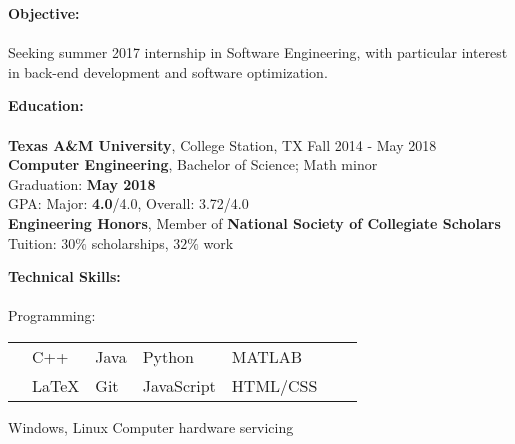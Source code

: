 \documentclass[12pt]{article}
\begin{document}
\begin{flushleft}
\begin{outline}[compactitem]

\newlength{\upspacelength}
\setlength{\upspacelength}{-0.8px}
\newcommand{\upspace}{\vspace{\upspacelength}}
\newcommand{\zzz}[1]{\upspace \0 \textbf{#1} \\ \vspace{-0.8\baselineskip} \hrulefill \vspace{-2px} \\ }
\let\oldOne\1\let\oldTwo\2\let\oldThree\3\let\oldFour\4
\renewcommand{\1}{\upspace \oldOne  }
\renewcommand{\2}{\upspace \oldTwo  }
\renewcommand{\3}{\upspace \oldThree}
\renewcommand{\4}{\upspace \oldFour }


\zzz{Objective:}
  \1 Seeking summer 2017 internship in Software Engineering, with particular interest in back-end development and software optimization.

\zzz{Education:}
  \1 \textbf{Texas A\&M University}, College Station, TX \hfill Fall 2014 - May 2018
  \\ \textbf{Computer Engineering}, Bachelor of Science; Math minor
  \\ Graduation: \textbf{May 2018}
  \\ GPA:  Major: \textbf{4.0}/4.0, Overall: 3.72/4.0
  \\ \textbf{Engineering Honors}, Member of \textbf{National Society of Collegiate Scholars}
  \\ Tuition: $30\%$ scholarships, $32\%$ work

\zzz{Technical Skills:}
  \1 Programming: 
    \\
    \vspace{-\baselineskip}\vspace{-\upspacelength}
    \begin{tabularx}{\textwidth}{X X X X X X X}
      & C++   & Java & Python     & MATLAB   \upspace \\
      & LaTeX & Git  & JavaScript & HTML/CSS \upspace \\
    \end{tabularx}
    \vspace{-5px}\upspace
  \1 
    Windows, Linux
    \hfill{}\hspace{1px}
    Computer hardware servicing
    \hfill\hfill


\end{outline}
\end{flushleft}
\end{document}
